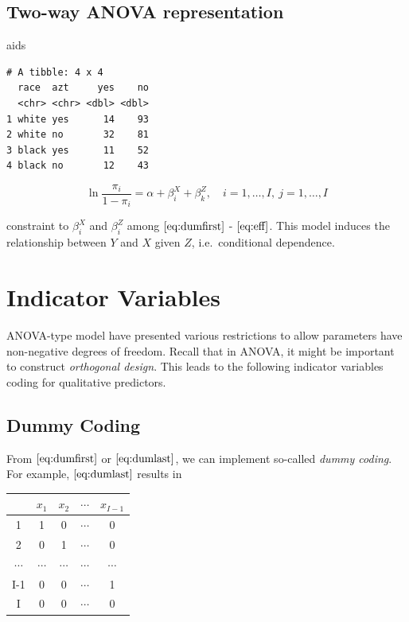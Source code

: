 \documentclass[]{book}
\newenvironment{Shaded}{\begin{snugshade}}{\end{snugshade}}
\newcommand{\NormalTok}[1]{#1}
\begin{document}
\hypertarget{two-way-anova-representation}{%
\subsection{Two-way ANOVA representation}\label{two-way-anova-representation}}

\begin{Shaded}
\begin{Highlighting}[]
\NormalTok{aids}
\end{Highlighting}
\end{Shaded}

\begin{verbatim}
# A tibble: 4 x 4
  race  azt     yes    no
  <chr> <chr> <dbl> <dbl>
1 white yes      14    93
2 white no       32    81
3 black yes      11    52
4 black no       12    43
\end{verbatim}

\[
\ln\frac{\pi_i}{1 - \pi_i} = \alpha + \beta_i^X + \beta_k^Z, \quad i = 1, \ldots, I,\: j = 1, \ldots, I
\]

constraint to \(\beta_i^X\) and \(\beta_i^Z\) among \(\eqref{eq:dumfirst}\) - \(\eqref{eq:eff}\). This model induces the relationship between \(Y\) and \(X\) given \(Z\), i.e.~conditional dependence.

\hypertarget{indicator-variables}{%
\section{Indicator Variables}\label{indicator-variables}}

ANOVA-type model have presented various restrictions to allow parameters have non-negative degrees of freedom. Recall that in ANOVA, it might be important to construct \emph{orthogonal design}. This leads to the following indicator variables coding for qualitative predictors.

\hypertarget{dummy-coding}{%
\subsection{Dummy Coding}\label{dummy-coding}}

From \(\eqref{eq:dumfirst}\) or \(\eqref{eq:dumlast}\), we can implement so-called \emph{dummy coding}. For example, \(\eqref{eq:dumlast}\) results in

\begin{longtable}[]{@{}ccccc@{}}
\toprule
& \(x_1\) & \(x_2\) & \(\cdots\) & \(x_{I-1}\)\tabularnewline
\midrule
\endhead
1 & 1 & 0 & \(\cdots\) & 0\tabularnewline
2 & 0 & 1 & \(\cdots\) & 0\tabularnewline
\(\cdots\) & \(\cdots\) & \(\cdots\) & \(\cdots\) & \(\cdots\)\tabularnewline
I-1 & 0 & 0 & \(\cdots\) & 1\tabularnewline
I & 0 & 0 & \(\cdots\) & 0\tabularnewline
\bottomrule
\end{longtable}
\end{document}
